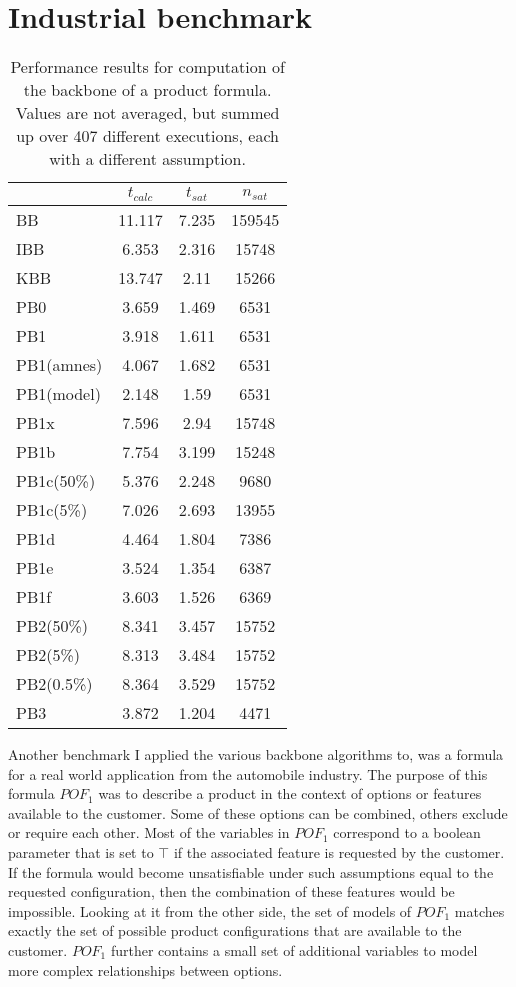 \section{Industrial benchmark}
\label{sec:sectionVonThore}

\begin{wraptable}[29]{r}{7cm}
\begin{tabular}{l| c c c }
&$t_{calc}$ & $t_{sat}$& $n_{sat}$ \\
\hline
BB & 11.117 & 7.235 & 159545 \\
IBB & 6.353 & 2.316 & 15748 \\
KBB & 13.747 & 2.11 & 15266 \\
PB0 & 3.659 & 1.469 & 6531 \\
PB1 & 3.918 & 1.611 & 6531 \\
PB1(amnes) & 4.067 & 1.682 & 6531 \\
PB1(model) & 2.148 & 1.59 & 6531 \\
PB1x & 7.596 & 2.94 & 15748 \\
PB1b & 7.754 & 3.199 & 15248 \\ %
PB1c(50\%) & 5.376 & 2.248 & 9680 \\
PB1c(5\%) & 7.026 & 2.693 & 13955 \\
PB1d & 4.464 & 1.804 & 7386 \\
PB1e & 3.524 & 1.354 & 6387 \\
PB1f & 3.603 & 1.526 & 6369 \\
PB2(50\%) & 8.341 & 3.457 & 15752 \\
PB2(5\%) & 8.313 & 3.484 & 15752 \\
PB2(0.5\%) & 8.364 & 3.529 & 15752 \\
PB3 & 3.872 & 1.204 & 4471 \\
\end{tabular}
\caption{Performance results for computation of the backbone of a product formula. Values are not averaged, but summed up over 407 different executions, each with a different assumption.}
\label{tab:vonThore1}
\end{wraptable}

Another benchmark I applied the various backbone algorithms to, was a formula for a real world application from the automobile industry. The purpose of this formula $POF_1$ was to describe a product in the context of options or features available to the customer. Some of these options can be combined, others exclude or require each other. Most of the variables in $POF_1$ correspond to a boolean parameter that is set to $\top$ if the associated feature is requested by the customer. If the formula would become unsatisfiable under such assumptions equal to the requested configuration, then the combination of these features would be impossible. Looking at it from the other side, the set of models of $POF_1$ matches exactly the set of possible product configurations that are available to the customer. $POF_1$ further contains a small set of additional variables to model more complex relationships between options.

